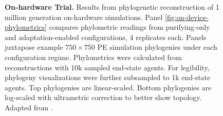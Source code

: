 \begin{figure}
\caption{%
\textbf{On-hardware Trial.}
\footnotesize
Results from phylogenetic reconstruction of 1 million generation on-hardware simulations.
Panel \ref{fig:on-device-phylometrics} compares phylometric readings from purifying-only and adaptation-enabled configurations, 4 replicates each.
Panels  juxtapose example $750\times750$ PE simulation phylogenies under each configuration regime.
Phylometrics were calculated from reconstructions with 10k sampled end-state agents.
For legibility, phylogeny visualizations were further subsampled to 1k end-state agents.
Top phylogenies are linear-scaled.
Bottom phylogenies are log-scaled with ultrametric correction to better show topology.
Adapted from \citep{moreno2024trackable}.
}
\label{fig:on-device}
\end{figure}
